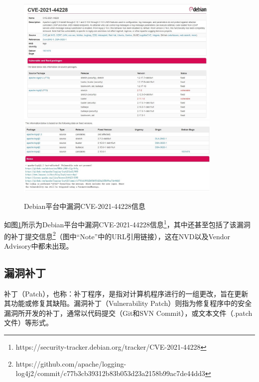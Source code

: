 

\begin{figure}[h]
    \centering
    \includegraphics[width=0.88\textwidth]{fig/debian-2021-44228}
    \includegraphics[width=0.88\textwidth]{fig/debian-2021-44228-2}
    \caption{Debian平台中漏洞CVE-2021-44228信息}
    \label{fig:debian-2021-44228}
\end{figure}
如图\ref{fig:debian-2021-44228}所示为Debian平台中漏洞CVE-2021-44228信息\footnote{https://security-tracker.debian.org/tracker/CVE-2021-44228}，其中还甚至包括了该漏洞的补丁提交信息\footnote{https://github.com/apache/logging-log4j2/commit/c77b3cb39312b83b053d23a2158b99ac7de44dd3}（图中“Note”中的URL引用链接），这在NVD以及Vendor Advisory中都未出现。


\subsection{漏洞补丁}
补丁（Patch），也称：补丁程序，是指对计算机程序进行的一组更改，旨在更新其功能或修复其缺陷。漏洞补丁（Vulnerability Patch）则指为修复程序中的安全漏洞所开发的补丁，通常以代码提交（Git和SVN Commit），或文本文件（.patch文件）等形式。

